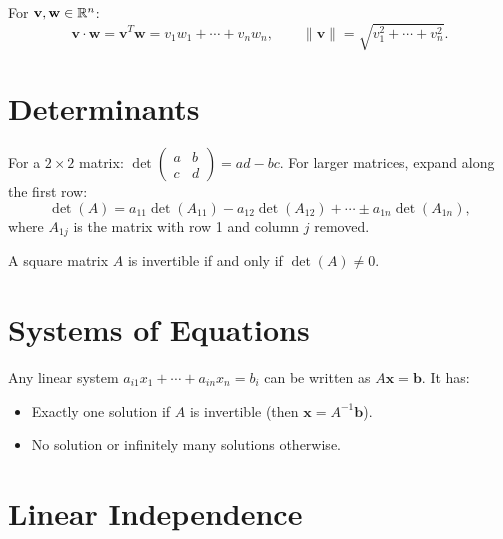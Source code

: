 \begin{definition}
For $\mathbf{v},\mathbf{w}\in\mathbb{R}^n$:
\[
  \mathbf{v}\cdot\mathbf{w} = \mathbf{v}^T\mathbf{w} = v_1w_1+\cdots+v_nw_n, \qquad
  \|\mathbf{v}\| = \sqrt{v_1^2+\cdots+v_n^2}.
\]
\end{definition}

\section{Determinants}

\begin{definition}[Determinant]
For a $2\times2$ matrix: $\det\begin{pmatrix}a&b\\c&d\end{pmatrix} = ad-bc$.
For larger matrices, expand along the first row:
\[
  \det(A) = a_{11}\det(A_{11}) - a_{12}\det(A_{12}) + \cdots \pm a_{1n}\det(A_{1n}),
\]
where $A_{1j}$ is the matrix with row 1 and column $j$ removed.
\end{definition}

\begin{theorem}
A square matrix $A$ is invertible if and only if $\det(A)\neq 0$.
\end{theorem}

\section{Systems of Equations}

\begin{theorem}
Any linear system $a_{i1}x_1+\cdots+a_{in}x_n=b_i$ can be written as $A\mathbf{x}=\mathbf{b}$. It has:
\begin{itemize}
  \item Exactly one solution if $A$ is invertible (then $\mathbf{x}=A^{-1}\mathbf{b}$).
  \item No solution or infinitely many solutions otherwise.
\end{itemize}
\end{theorem}

\section{Linear Independence}

